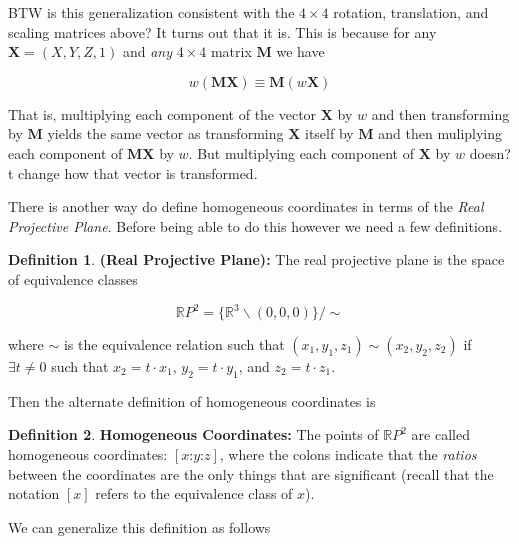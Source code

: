 \documentclass{article}
\theoremstyle{definition}
\newtheorem{definition}{Definition}[section]
\begin{document}
\bigskip
\noindent
BTW is this generalization consistent with the $4 \times 4$ rotation, translation, and scaling matrices above? It turns out that it is. This is because
for any $\mathbf{X} = (X, Y, Z, 1)$ and \emph{any} $4 \times 4$ matrix $\mathbf{M}$ we have

\begin{equation*}
w(\mathbf{MX}) \equiv \mathbf{M}(w\mathbf{X})
\end{equation*}

\bigskip
\noindent
That is, multiplying each component of the vector $\mathbf{X}$ by $w$ and then transforming by $\mathbf{M}$ yields the same vector as transforming 
$\mathbf{X}$ itself by $\mathbf{M}$ and then muliplying each component of $\mathbf{MX}$ by $w$. But multiplying each component of $\mathbf{X}$
by $w$ doesn?t change how that vector is transformed.

\bigskip
\noindent
There is another way do define homogeneous coordinates in terms of the \emph{Real Projective Plane}. Before being able to do this however we need 
a few definitions.

\begin{definition} {\bf (Real Projective Plane):}
The real projective plane is the space of equivalence classes

\begin{equation*}
\mathbb{R}P^2 =  \{\mathbb{R}^3 \backslash (0,0,0) \} / \sim
\label{eqn:rpp}
\end{equation*}

\bigskip
\noindent
where $\sim$ is the equivalence relation such that $(x_1,y_1,z_1) \sim (x_2,y_2,z_2)$
if $\exists t \neq 0$ such that $x_2 = t \cdot x_1$, $y_2 = t \cdot y_1$, and $z_2 = t \cdot z_1$.
\end{definition}

\bigskip
\noindent
Then the alternate definition of  homogeneous coordinates is

\begin{definition} {\bf Homogeneous Coordinates:}
The points of $\mathbb{R}P^2$ are called homogeneous coordinates: $[x \mathord{:} y \mathord{:} z]$, where the colons indicate that the \emph{ratios}
between the coordinates are the only things that are significant (recall that the notation $[x]$ refers to the equivalence class of $x$).
\end{definition}

\bigskip
\noindent
We can generalize this definition as follows
\end{document}
